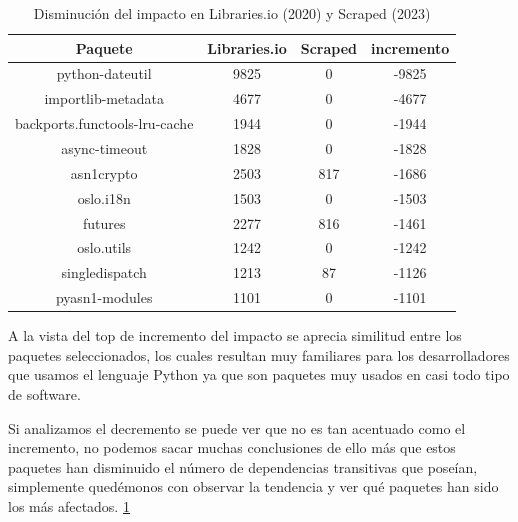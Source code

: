 \begin{table}[ht!]
    \centering
    \label{tab:Disminución del impacto en Libraries.io y Scraped}
    \begin{tabular}{|c|c|c|c|}
        \hline
        \textbf{Paquete}              & \textbf{Libraries.io} & \textbf{Scraped} & \textbf{incremento} \\
        \hline
        python-dateutil               & 9825                 & 0                & -9825               \\
        importlib-metadata            & 4677                 & 0                & -4677               \\
        backports.functools-lru-cache & 1944                 & 0                & -1944               \\
        async-timeout                 & 1828                 & 0                & -1828               \\
        asn1crypto                    & 2503                 & 817              & -1686               \\
        oslo.i18n                     & 1503                 & 0                & -1503               \\
        futures                       & 2277                 & 816              & -1461               \\
        oslo.utils                    & 1242                 & 0                & -1242               \\
        singledispatch                & 1213                 & 87               & -1126               \\
        pyasn1-modules                & 1101                 & 0                & -1101               \\
        \hline
    \end{tabular}
    \caption{Disminución del impacto en Libraries.io (2020) y Scraped (2023)}
\end{table}

A la vista del top de incremento del impacto se aprecia similitud entre los paquetes seleccionados,
los cuales resultan muy familiares para los desarrolladores que usamos el lenguaje Python ya que
son paquetes muy usados en casi todo tipo de software.

Si analizamos el decremento se puede ver que no es tan acentuado como el incremento, no
podemos sacar muchas conclusiones de ello más que estos paquetes han disminuido el número de
dependencias transitivas que poseían, simplemente quedémonos con observar la tendencia y ver qué
paquetes han sido los más afectados. \ref{tab:Disminución del impacto en Libraries.io y Scraped}


